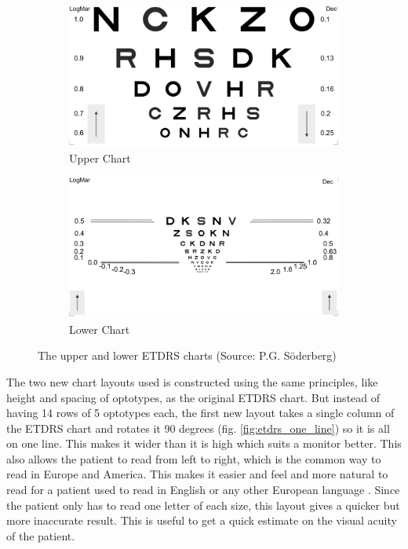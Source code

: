 \documentclass[12pt,a4paper,notitlepage]{report}
\begin{document}
\begin{figure}[ht!]
\centering
\begin{subfigure}{.8\textwidth}
  \centering
  \includegraphics[width=100mm]{images/etdrs_top.png}
  \caption{Upper Chart}
  \label{fig:etdrs_upper}
\end{subfigure}%

\begin{subfigure}{.8\textwidth}
  \centering
  \includegraphics[width=100mm]{images/etdrs_bottom.png}
  \caption{Lower Chart}
  \label{fig:etdrs_lower}
\end{subfigure}
\caption[Upper and lower ETDRS charts]{The upper and lower ETDRS charts (Source: P.G. Söderberg)}
\label{fig:etdrs_upper_lower}
\end{figure}

The two new chart layouts used is constructed using the same principles, like height and spacing of optotypes, as the original ETDRS chart. But instead of having 14 rows of 5 optotypes each, the first new layout takes a single column of the ETDRS chart and rotates it 90 degrees (fig. \ref{fig:etdrs_one_line}) so it is all on one line. This makes it wider than it is high which suits a monitor better. This also allows the patient to read from left to right, which is the common way to read in Europe and America. This makes it easier and feel and more natural to read for a patient used to read in English or any other European language \cite{PGSoderbergOral}. Since the patient only has to read one letter of each size, this layout gives a quicker but more inaccurate result. This is useful to get a quick estimate on the visual acuity of the patient.
\end{document}
